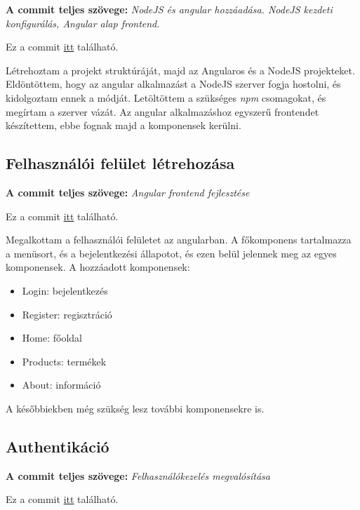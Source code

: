 \documentclass[]{article}
\begin{document}
\noindent
\textbf{A commit teljes szövege:} \textit{NodeJS és angular hozzáadása. NodeJS kezdeti konfigurálás, Angular alap frontend.}

\bigskip
\noindent
Ez a commit \href{https://github.com/Gtomika/prf-project/commit/170975c76199384bc0c8c9524929d8804e70a56d}{itt} található.
\bigskip

Létrehoztam a projekt struktúráját, majd az Angularos és a NodeJS projekteket. Eldöntöttem, hogy az angular alkalmazást a NodeJS szerver fogja hostolni, és kidolgoztam ennek a módját. 
Letöltöttem a szükséges \textit{npm} csomagokat, és megírtam a szerver vázát. Az angular alkalmazáshoz egyszerű frontendet készítettem, ebbe fognak majd a komponensek kerülni.

\subsection{Felhasználói felület létrehozása}

\noindent
\textbf{A commit teljes szövege:} \textit{Angular frontend fejlesztése}

\bigskip
\noindent
Ez a commit \href{https://github.com/Gtomika/prf-project/commit/53e7acb28718a72afb40870192a166d8839e0d08}{itt} található.
\bigskip

Megalkottam a felhasználói felületet az angularban. A főkomponens tartalmazza a menüsort, és a bejelentkezési állapotot, és ezen belül jelennek meg az egyes komponensek. A hozzáadott komponensek:

\begin{itemize}
	\item Login: bejelentkezés
	\item Register: regisztráció
	\item Home: főoldal
	\item Products: termékek
	\item About: információ
\end{itemize}

A későbbiekben még szükség lesz további komponensekre is.

\subsection{Authentikáció}

\noindent
\textbf{A commit teljes szövege:} \textit{Felhasználókezelés megvalósítása}

\bigskip
\noindent
Ez a commit \href{https://github.com/Gtomika/prf-project/commit/ac23392a3ebe9a36ad80a358ebb768bba0434b408}{itt} található.
\bigskip
\end{document}
